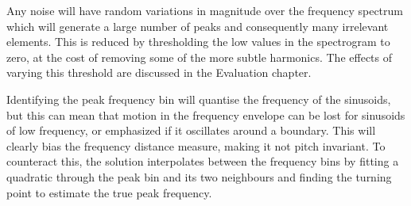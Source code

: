 \documentclass[12pt,a4paper,twoside,openright]{report}
\begin{document}
Any noise will have random variations in magnitude over the frequency spectrum which will generate a large number of peaks and consequently many irrelevant elements. This is reduced by thresholding the low values in the spectrogram to zero, at the cost of removing some of the more subtle harmonics. The effects of varying this threshold are discussed in the Evaluation chapter.


Identifying the peak frequency bin will quantise the frequency of the sinusoids, but this can mean that motion in the frequency envelope can be lost for sinusoids of low frequency, or emphasized if it oscillates around a boundary. This will clearly bias the frequency distance measure, making it not pitch invariant. To counteract this, the solution interpolates between the frequency bins by fitting a quadratic through the peak bin and its two neighbours and finding the turning point to estimate the true peak frequency.

\end{document}
